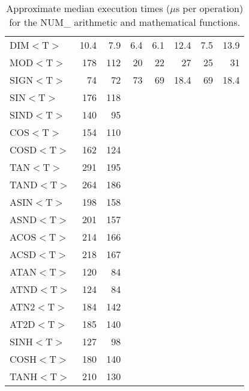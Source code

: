 \documentclass[11pt,nolof]{starlink}
\providecommand{\name}[1]{#1}
\begin{document}
\begin{table}[h]
\begin{center}
\begin{footnotesize}
\begin{tabular}{|l|r|r|r|r|r|r|r|}
DIM$<$T$>$ & 10.4 &  7.9 &  6.4 &  6.1 & 12.4 &  7.5 & 13.9 \\
MOD$<$T$>$ &  178 &  112 &   20 &   22 &   27 &   25 &   31 \\
SIGN$<$T$>$ &   74 &   72 &   73 &   69 & 18.4 &   69 & 18.4 \\
SIN$<$T$>$ &  176 &  118 &      &      &      &      &      \\
SIND$<$T$>$ &  140 &   95 &      &      &      &      &      \\
COS$<$T$>$ &  154 &  110 &      &      &      &      &      \\
COSD$<$T$>$ &  162 &  124 &      &      &      &      &      \\
TAN$<$T$>$ &  291 &  195 &      &      &      &      &      \\
TAND$<$T$>$ &  264 &  186 &      &      &      &      &      \\
ASIN$<$T$>$ &  198 &  158 &      &      &      &      &      \\
ASND$<$T$>$ &  201 &  157 &      &      &      &      &      \\
ACOS$<$T$>$ &  214 &  166 &      &      &      &      &      \\
ACSD$<$T$>$ &  218 &  167 &      &      &      &      &      \\
ATAN$<$T$>$ &  120 &   84 &      &      &      &      &      \\
ATND$<$T$>$ &  124 &   84 &      &      &      &      &      \\
ATN2$<$T$>$ &  184 &  142 &      &      &      &      &      \\
AT2D$<$T$>$ &  185 &  140 &      &      &      &      &      \\
SINH$<$T$>$ &  127 &   98 &      &      &      &      &      \\
COSH$<$T$>$ &  180 &  140 &      &      &      &      &      \\
TANH$<$T$>$ &  210 &  130 &      &      &      &      &      \\
\hline
\end{tabular}
\end{footnotesize}
\caption{Approximate median execution times ($\mu$s per operation) for the
\name{NUM\_} arithmetic and mathematical functions.}
\label{table:numstats}
\end{center}
\end{table}

\newpage
\end{document}
